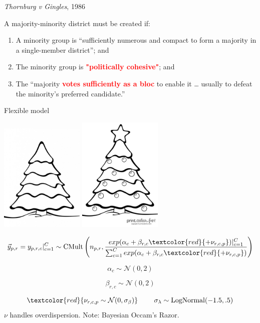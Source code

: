 \documentclass[
  ignorenonframetext,
]{beamer}
\begin{document}
\begin{frame}{\emph{Thornburg v Gingles}, 1986}
\protect\hypertarget{thornburg-v-gingles-1986}{}

A majority-minority district must be created if:

\begin{enumerate}
\item
  A minority group is ``sufficiently numerous and compact to form a
  majority in a single-member district''; and
\item
  The minority group is
  \textcolor{red}{\textbf{"politically cohesive"}}; and
\item
  The ``majority \textcolor{red}{\textbf{votes sufficiently as a bloc}}
  to enable it \ldots{} usually to defeat the minority's preferred
  candidate.''
\end{enumerate}

\end{frame}

\begin{frame}{Flexible model}
\protect\hypertarget{flexible-model}{}

\includegraphics[width=0.3\textwidth,height=\textheight]{holidaytree_bare.jpg}
\includegraphics[width=0.3\textwidth,height=\textheight]{holidaytree_decorated.png}

\[\vec{y}_{p,r}=y_{p,r,c}\vert_{c=1}^C\sim \operatorname{CMult}\left(n_{p,r},\frac{exp(\alpha_c+\beta_{r,c}\textcolor{red}{+\nu_{r,c,p}})\vert_{c=1}^C}{\sum_{c=1}^Cexp(\alpha_c+\beta_{r,c}\textcolor{red}{+\nu_{r,c,p}})}\right)\]

\[\alpha_c\sim\mathcal{N}(0,2)\]

\[\beta_{r,c}\sim\mathcal{N}(0,2)\]

\[\textcolor{red}{\nu_{r,c,p}\sim\mathcal{N}(0,\sigma_\beta)}~~~~~~~\sigma_\lambda\sim\operatorname{LogNormal}(-1.5,.5)\]
\(\nu\) handles overdispersion. Note: Bayesian Occam's Razor.

\end{frame}
\end{document}
